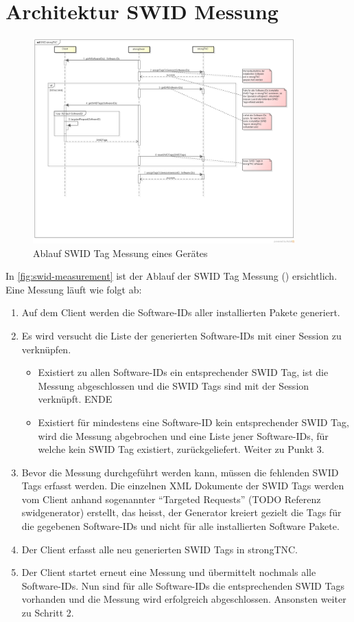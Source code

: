 \section{Architektur SWID Messung}
\begin{figure}[H]
\centering
\includegraphics[width=0.9\textwidth]{./images/architecture/SWID_strongTNC.png}
\caption{Ablauf SWID Tag Messung eines Gerätes}
\label{fig:swid-measurement}
\end{figure}
In \autoref{fig:swid-measurement} ist der Ablauf der SWID Tag Messung () ersichtlich.
Eine Messung läuft wie folgt ab:
\begin{enumerate}
\item Auf dem Client werden die Software-IDs aller installierten Pakete generiert. 
\item Es wird versucht die Liste der generierten Software-IDs mit einer Session zu verknüpfen.
	\begin{itemize}
	\item Existiert zu allen Software-IDs ein entsprechender SWID Tag, ist die Messung abgeschlossen und die SWID Tags sind mit der Session verknüpft. ENDE
	\item Existiert für mindestens eine Software-ID kein entsprechender SWID Tag, wird die Messung abgebrochen und eine Liste jener Software-IDs, für welche kein SWID Tag existiert, zurückgeliefert. Weiter zu Punkt 3.
	\end{itemize}
\item Bevor die Messung durchgeführt werden kann, müssen die fehlenden SWID Tags erfasst werden. Die einzelnen XML Dokumente der SWID Tags werden vom Client anhand sogenannter \enquote{Targeted Requests} (TODO Referenz swidgenerator) erstellt, das heisst, der Generator kreiert gezielt die Tags für die gegebenen Software-IDs und nicht für alle installierten Software Pakete.
\item Der Client erfasst alle neu generierten SWID Tags in strongTNC.
\item Der Client startet erneut eine Messung und übermittelt nochmals alle Software-IDs. Nun sind für alle Software-IDs die entsprechenden SWID Tags vorhanden und die Messung wird erfolgreich abgeschlossen. Ansonsten weiter zu Schritt 2.
\end{enumerate}
